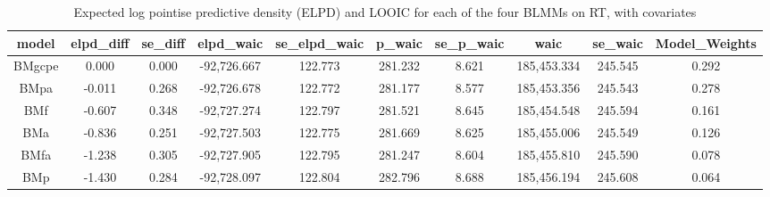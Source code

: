 \documentclass[
  11pt,
  english,
  ,doc,floatsintext]{apa6}
\begin{document}
\begin{table}[htb]

\begin{center}
\begin{threeparttable}

\caption{\label{tab:modelComp2RT}Expected log pointise predictive density (ELPD) and LOOIC for each of the four BLMMs on RT, with covariates}

\tiny{

\begin{tabular}{cccccccccc}
\toprule
model & \multicolumn{1}{c}{elpd\_diff} & \multicolumn{1}{c}{se\_diff} & \multicolumn{1}{c}{elpd\_waic} & \multicolumn{1}{c}{se\_elpd\_waic} & \multicolumn{1}{c}{p\_waic} & \multicolumn{1}{c}{se\_p\_waic} & \multicolumn{1}{c}{waic} & \multicolumn{1}{c}{se\_waic} & \multicolumn{1}{c}{Model\_Weights}\\
\midrule
BMgcpe & 0.000 & 0.000 & -92,726.667 & 122.773 & 281.232 & 8.621 & 185,453.334 & 245.545 & 0.292\\
BMpa & -0.011 & 0.268 & -92,726.678 & 122.772 & 281.177 & 8.577 & 185,453.356 & 245.543 & 0.278\\
BMf & -0.607 & 0.348 & -92,727.274 & 122.797 & 281.521 & 8.645 & 185,454.548 & 245.594 & 0.161\\
BMa & -0.836 & 0.251 & -92,727.503 & 122.775 & 281.669 & 8.625 & 185,455.006 & 245.549 & 0.126\\
BMfa & -1.238 & 0.305 & -92,727.905 & 122.795 & 281.247 & 8.604 & 185,455.810 & 245.590 & 0.078\\
BMp & -1.430 & 0.284 & -92,728.097 & 122.804 & 282.796 & 8.688 & 185,456.194 & 245.608 & 0.064\\
\bottomrule
\end{tabular}

}

\end{threeparttable}
\end{center}

\end{table}
\end{document}
